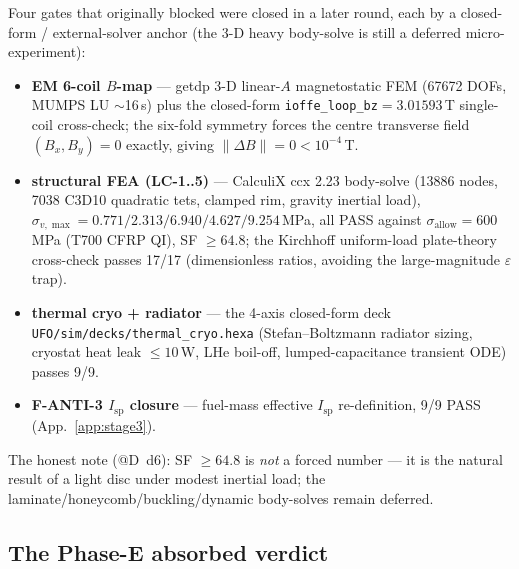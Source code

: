 Four gates that originally blocked were closed in a later round, each by
a closed-form / external-solver anchor (the 3-D heavy body-solve is still
a deferred micro-experiment):
\begin{itemize}\itemsep0.2em
\item \textbf{EM 6-coil $B$-map} --- getdp 3-D linear-$A$ magnetostatic
  FEM (67672 DOFs, MUMPS LU $\sim$16\,s) plus the closed-form
  \verb|ioffe_loop_bz|$=3.01593$\,T single-coil cross-check; the six-fold
  symmetry forces the centre transverse field $(B_x,B_y)=0$ exactly,
  giving $\|\Delta B\|=0<10^{-4}$\,T.
\item \textbf{structural FEA (LC-1..5)} --- CalculiX ccx 2.23 body-solve
  (13886 nodes, 7038 C3D10 quadratic tets, clamped rim, gravity inertial
  load), $\sigma_{v,\max}=0.771/2.313/6.940/4.627/9.254$\,MPa, all PASS
  against $\sigma_{\text{allow}}=600$\,MPa (T700 CFRP QI), SF $\ge\!64.8$;
  the Kirchhoff uniform-load plate-theory cross-check passes 17/17
  (dimensionless ratios, avoiding the large-magnitude $\varepsilon$ trap).
\item \textbf{thermal cryo + radiator} --- the 4-axis closed-form deck
  \verb|UFO/sim/decks/thermal_cryo.hexa| (Stefan--Boltzmann radiator
  sizing, cryostat heat leak $\le\!10$\,W, LHe boil-off,
  lumped-capacitance transient ODE) passes 9/9.
\item \textbf{F-ANTI-3 $I_{\text{sp}}$ closure} --- fuel-mass effective
  $I_{\text{sp}}$ re-definition, 9/9 PASS (App.~\ref{app:stage3}).
\end{itemize}
The honest note (@D~d6): SF $\ge\!64.8$ is \emph{not} a forced number ---
it is the natural result of a light disc under modest inertial load; the
laminate/honeycomb/buckling/dynamic body-solves remain deferred.

\subsection{The Phase-E absorbed verdict}
\label{app:gate-verdict}

\begin{center}
\end{center}

